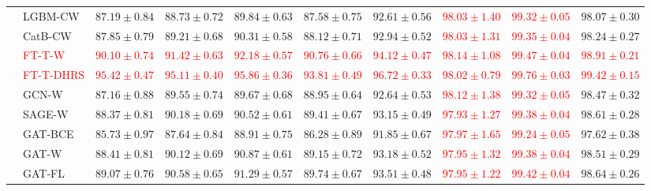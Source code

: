 \documentclass[pdflatex,sn-mathphys-num]{sn-jnl}%
\theoremstyle{thmstyleone}%
\theoremstyle{thmstyletwo}%
\theoremstyle{thmstylethree}%
\begin{document}
\begin{table}[!ht]
{\begin{tabular}{@{}llcccccccc@{}}
& LGBM-CW
& $87.19\pm0.84$
& $88.73\pm0.72$
& $89.84\pm0.63$
& $87.58\pm0.75$
& $92.61\pm0.56$
& \textcolor{red}{$98.03\pm1.40$}
& \textcolor{red}{$99.32\pm0.05$}
& $98.07\pm0.30$ \\

& CatB-CW
& $87.85\pm0.79$
& $89.21\pm0.68$
& $90.31\pm0.58$
& $88.12\pm0.71$
& $92.94\pm0.52$
& \textcolor{red}{$98.03\pm1.31$}
& \textcolor{red}{$99.35\pm0.04$}
& $98.24\pm0.27$ \\


& \textcolor{red}{FT-T-W}
& \textcolor{red}{$90.10\pm0.74$}
& \textcolor{red}{$91.42\pm0.63$}
& \textcolor{red}{$92.18\pm0.57$}
& \textcolor{red}{$90.76\pm0.66$}
& \textcolor{red}{$94.12\pm0.47$}
& \textcolor{red}{$98.14\pm1.08$}
& \textcolor{red}{$99.47\pm0.04$}
& \textcolor{red}{$98.91\pm0.21$} \\

& \textcolor{red}{FT-T-DHRS}
& \textcolor{red}{$95.42\pm0.47$}
& \textcolor{red}{$95.11\pm0.40$}
& \textcolor{red}{$95.86\pm0.36$}
& \textcolor{red}{$93.81\pm0.49$}
& \textcolor{red}{$96.72\pm0.33$}
& \textcolor{red}{$98.02\pm0.79$}
& \textcolor{red}{$99.76\pm0.03$}
& \textcolor{red}{$99.42\pm0.15$} \\

\addlinespace[1pt]

& GCN-W
& $87.16\pm0.88$
& $89.55\pm0.74$
& $89.67\pm0.68$
& $88.95\pm0.64$
& $92.64\pm0.53$
& \textcolor{red}{$98.12\pm1.38$}
& \textcolor{red}{$99.32\pm0.05$}
& $98.47\pm0.32$ \\

& SAGE-W
& $88.37\pm0.81$
& $90.18\pm0.69$
& $90.52\pm0.61$
& $89.41\pm0.67$
& $93.15\pm0.49$
& \textcolor{red}{$97.93\pm1.27$}
& \textcolor{red}{$99.38\pm0.04$}
& $98.61\pm0.28$ \\

\addlinespace[1pt]

& GAT-BCE
& $85.73\pm0.97$
& $87.64\pm0.84$
& $88.91\pm0.75$
& $86.28\pm0.89$
& $91.85\pm0.67$
& \textcolor{red}{$97.97\pm1.65$}
& \textcolor{red}{$99.24\pm0.05$}
& $97.62\pm0.38$ \\

& GAT-W
& $88.41\pm0.81$
& $90.12\pm0.69$
& $90.87\pm0.61$
& $89.15\pm0.72$
& $93.18\pm0.52$
& \textcolor{red}{$97.95\pm1.32$}
& \textcolor{red}{$99.38\pm0.04$}
& $98.51\pm0.29$ \\

& GAT-FL
& $89.07\pm0.76$
& $90.58\pm0.65$
& $91.29\pm0.57$
& $89.74\pm0.67$
& $93.51\pm0.48$
& \textcolor{red}{$97.95\pm1.22$}
& \textcolor{red}{$99.42\pm0.04$}
& $98.64\pm0.26$ \\


\end{tabular}}
\end{table}
\end{document}
